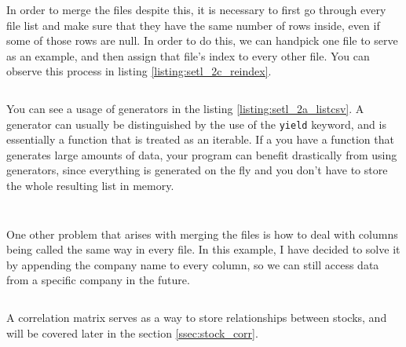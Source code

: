 \documentclass[12pt, a4paper]{article}
\begin{document}
In order to merge the files despite this, it is necessary to first go through every file list and make sure that they have the same number of rows inside, even if some of those rows are null. In order to do this, we can handpick one file to serve as an example, and then assign that file’s index to every other file. You can observe this process in listing \ref{listing:setl_2c_reindex}.

\bgroup
  \inputminted[linenos, breaklines=true, fontsize=\scriptsize, firstnumber=last]{python}{src/stocks/etl/2b_timearr.py}
  \label{listing:setl_2b_timearr}
\egroup

You can see a usage of generators in the listing \ref{listing:setl_2a_listcsv}. A generator can usually be distinguished by the use of the \texttt{yield} keyword, and is essentially a function that is treated as an iterable. If a you have a function that generates large amounts of data, your program can benefit drastically from using generators, since everything is generated on the fly and you don't have to store the whole resulting list in memory.

\bgroup
  \inputminted[linenos, breaklines=true, fontsize=\scriptsize, firstnumber=last]{python}{src/stocks/etl/2a_listcsv.py}
  \label{listing:setl_2a_listcsv}
\egroup

\bgroup
  \inputminted[linenos, breaklines=true, fontsize=\scriptsize, firstnumber=last]{python}{src/stocks/etl/2c_reindex.py}
  \label{listing:setl_2c_reindex}
\egroup

One other problem that arises with merging the files is how to deal with columns being called the same way in every file. In this example, I have decided to solve it by appending the company name to every column, so we can still access data from a specific company in the future.

\bgroup
  \inputminted[linenos, breaklines=true, fontsize=\scriptsize, firstnumber=last]{python}{src/stocks/etl/2d_merge.py}
  \label{listing:setl_2d_merge}
\egroup

A correlation matrix serves as a way to store relationships between stocks, and will be covered later in the section \ref{ssec:stock_corr}.

\bgroup
  \inputminted[linenos, breaklines=true, fontsize=\scriptsize, firstnumber=last]{python}{src/stocks/etl/2f_corr.py}
  \label{listing:setl_2f_corr}
\egroup
\end{document}
